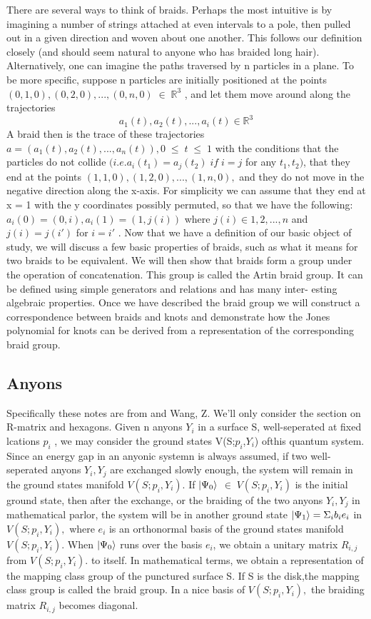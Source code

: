 \documentclass[preprint, 5p, 10pt]{elsarticle}
\theoremstyle{plain}
\begin{document}
There are several ways to think of braids. Perhaps the most intuitive is
by imagining a number of strings attached at even intervals to a pole, then
pulled out in a given direction and woven about one another. This follows
our definition closely (and should seem natural to anyone who has braided
long hair). Alternatively, one can imagine the paths traversed by n particles
in a plane. To be more specific, suppose n particles are initially positioned
at the points $(0, 1, 0), (0, 2, 0), . . . , (0, n, 0)\; \in \;\mathbb{R}^{3}$ , and let them move around
along the trajectories
\begin{equation}
a_{1}(t),a_2(t),...,a_i(t)\in \mathbb{R}^{3}
\end{equation}
A braid then is the trace of these trajectories $a = (a_1(t), a_2(t), . . . , a_n(t)), 
0 \;\leq \;t \;\leq \;1$ with the conditions that the particles do not collide $(i.e. a_i (t_1 ) = a_j (t_2 )\; if\;
i = j$ for any $t_1 , t_2 )$, that they end at the points $(1, 1, 0), (1, 2, 0), . . . , (1, n, 0), $
and they do not move in the negative direction along the x-axis. For 
simplicity we can assume that they end at x = 1 with the y coordinates possibly
permuted, so that we have the following:
$a_i (0) = (0, i), a_i (1) = (1, j(i))$ where $j(i) \in {1, 2, . . . , n}$
and $j(i) = j(i′ )$ for $i = i′$ .
Now that we have a definition of our basic object of study, we
will discuss a few basic properties of braids, such as what it means for two
braids to be equivalent. We will then show that braids form a group under
the operation of concatenation. This group is called the Artin braid group.
It can be defined using simple generators and relations and has many inter-
esting algebraic properties. Once we have described the braid group we will
construct a correspondence between braids and knots and demonstrate how
the Jones polynomial for knots can be derived from a representation of the
corresponding braid group.

\subsection{Anyons}
Specifically these notes are from \cite{2009arXiv0902.3275T} and Wang, Z.
  We'll only consider the section on R-matrix and hexagons. Given n anyons $Y_i$ in a surface S, well-seperated at fixed lcations $p_i$
, we may consider the ground states V(S;$p_i$,$Y_i$) ofthis quantum system. Since an energy gap in an anyonic systemn is always assumed, if two
well-seperated anyons $Y_i,Y_j$ are exchanged slowly enough, the system will remain in the ground states manifold $V(S;p_i,Y_i).$ If $\ket{\Psi_{0}}$
$\in\;V(S;p_i,Y_i)$ is the initial ground state, then after the exchange, or the braiding of the two anyons $Y_i,Y_j$ in mathematical parlor,
the system will be in another ground state $\ket{\Psi_{1}}= {\Sigma}_i b_ie_i$ in $V(S;p_i,Y_i),$ where $e_i$ is an orthonormal basis of the ground states manifold 
$V(S;p_i,Y_i).$ When $\ket{\Psi_0}$ runs over the basis $e_i$, we obtain a unitary matrix $R_{i,j}$ from $V(S;p_i,Y_i).$  to itself. In mathematical
terms, we obtain a representation of the mapping class group of the punctured surface S. If S is the disk,the mapping class group is called 
the braid group. In a nice basis of $V(S;p_i,Y_i),$ the braiding matrix $R_{i,j}$ becomes diagonal.
\end{document}
